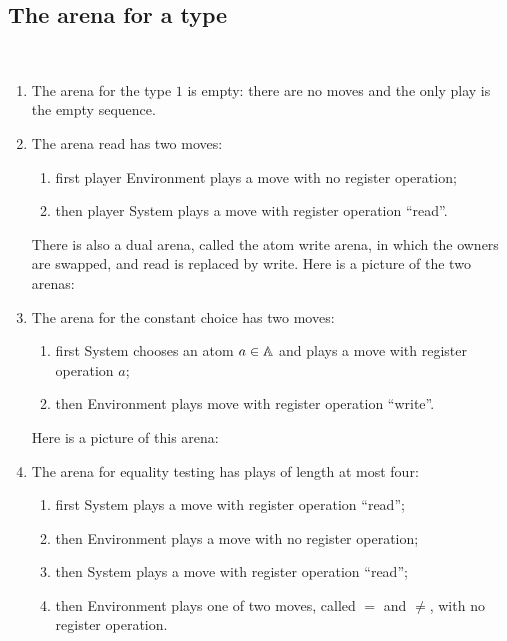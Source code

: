\subsection{The arena for a type}


\begin{definition} \ 
    \begin{enumerate}
        \item     The arena for the type $1$ is empty: there are no moves and the only play is the empty sequence. 
        \item The arena read has two moves: 
        \begin{enumerate}
            \item first player Environment plays a move with no register operation;
            \item then player System plays a move with register operation ``read''.
        \end{enumerate}
        There is also a dual arena, called the atom write arena, in which the owners are swapped, and read is replaced by write.
        Here is a picture of the two arenas:
        \item The arena for the constant choice has two moves: 
        \begin{enumerate}
            \item first System chooses an atom $a \in \mathbb A$ and plays a move with register operation $a$;
            \item then Environment plays move with register operation ``write''.
        \end{enumerate}
        Here is a picture of this arena:
        \item The arena for equality testing has plays of length at most four:
        \begin{enumerate}
            \item first System plays a move with register operation ``read'';
            \item then Environment plays a move with no register operation;
            \item then System plays a move with register operation ``read'';
            \item then Environment plays one of two moves, called $=$ and $\neq$, with no register operation.
        \end{enumerate}
    \end{enumerate}
\end{definition}


